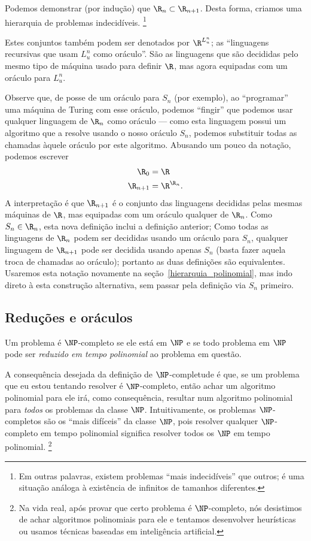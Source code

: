 Podemos demonstrar (por indução) que $\R_n \subset \R_{n+1}$.
Desta forma,
criamos uma hierarquia de problemas indecidíveis.%
\footnote{
    Em outras palavras,
    existem problemas ``mais indecidíveis'' que outros;
    é uma situação análoga à existência de infinitos de tamanhos diferentes.
}

Estes conjuntos também podem ser denotados por $\R^{L_u^n}$;
as ``linguagens recursivas que usam $L_u^n$ como oráculo''.
São as linguagens que são decididas
pelo mesmo tipo de máquina usado para definir $\R$,
mas agora equipadas com um oráculo para $L_u^n$.

Observe que,
de posse de um oráculo para $S_n$ (por exemplo),
ao ``programar'' uma máquina de Turing com esse oráculo,
podemos ``fingir'' que podemos usar qualquer linguagem de $\R_n$ como oráculo
--- como esta linguagem possui um algoritmo que a resolve
usando o nosso oráculo $S_n$,
podemos substituir todas as chamadas àquele oráculo
por este algoritmo.
Abusando um pouco da notação,
podemos escrever
\begin{equation}
    \begin{aligned}
        \R_0 &= \R \\
        \R_{n+1} &= \R^{\R_n}.
    \end{aligned}
    \label{abuso_notacao_oraculos}
\end{equation}
A interpretação é que $\R_{n+1}$ é o conjunto das linguagens
decididas pelas mesmas máquinas de $\R$,
mas equipadas com um oráculo qualquer de $\R_n$.
Como $S_n \in \R_n$, esta nova definição inclui a definição anterior;
Como todas as linguagens de $\R_n$ podem ser decididas usando um oráculo para $S_n$,
qualquer linguagem de $\R_{n+1}$
pode ser decidida usando apenas $S_n$
(basta fazer aquela troca de chamadas ao oráculo);
portanto as duas definições são equivalentes.
Usaremos esta notação novamente na seção~\ref{hierarquia_polinomial},
mas indo direto à esta construção alternativa,
sem passar pela definição via $S_n$ primeiro.

\subsection{Reduções e oráculos}

Um problema é $\NP$-completo se
ele está em $\NP$
e se todo problema em $\NP$ pode ser \emph{reduzido em tempo polinomial}
ao problema em questão.

A consequência desejada da definição de $\NP$-completude é que,
se um problema que eu estou tentando resolver é $\NP$-completo,
então achar um algoritmo polinomial para ele
irá, como consequência,
resultar num algoritmo polinomial para \emph{todos} os problemas da classe $\NP$.
Intuitivamente,
os problemas $\NP$-completos são os ``mais difíceis'' da classe $\NP$,
pois resolver qualquer $\NP$-completo em tempo polinomial
significa resolver todos os $\NP$ em tempo polinomial.%
\footnote{
    Na vida real,
    após provar que certo problema é $\NP$-completo,
    nós desistimos de achar algoritmos polinomiais para ele
    e tentamos desenvolver heurísticas
    ou usamos técnicas baseadas em inteligência artificial.
}

